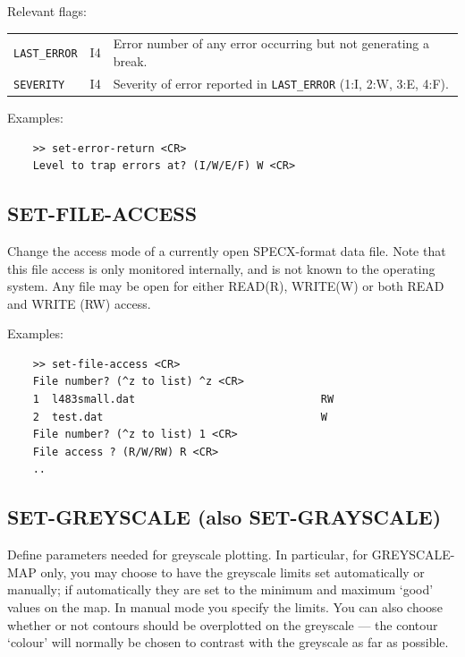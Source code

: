 \documentclass[11pt,twoside]{report}
\begin{document}
Relevant flags:\\
\begin{tabular}{lll}
   \verb+LAST_ERROR+ & I4 & Error number of any error occurring but not generating
                            a break.\\
   \verb+SEVERITY+   & I4 & Severity of error reported in \verb+LAST_ERROR+
                            (1:I, 2:W, 3:E, 4:F).
\end{tabular}

Examples:
\begin{verbatim}
    >> set-error-return <CR>
    Level to trap errors at? (I/W/E/F) W <CR>
\end{verbatim}

\subsection{SET-FILE-ACCESS} 

Change the access mode of a currently open SPECX-format data file. Note that
this file access is only monitored internally, and is not known to the operating
system. Any file may be open for either READ(R), WRITE(W) or both READ and
WRITE (RW) access.

Examples:
\begin{verbatim}
    >> set-file-access <CR>
    File number? (^z to list) ^z <CR>
    1  l483small.dat                             RW
    2  test.dat                                  W
    File number? (^z to list) 1 <CR>
    File access ? (R/W/RW) R <CR>
    ..
\end{verbatim}

\subsection{SET-GREYSCALE (also SET-GRAYSCALE)}

Define parameters needed for greyscale plotting. In particular, for GREYSCALE-MAP
only, you may choose to have the greyscale limits set automatically or manually;
if automatically they are set to the minimum and maximum `good' values on the
map. In manual mode you specify the limits. You can also choose whether or not
contours should be overplotted on the greyscale --- the contour `colour' will
normally be chosen to contrast with the greyscale as far as possible.
\end{document}
